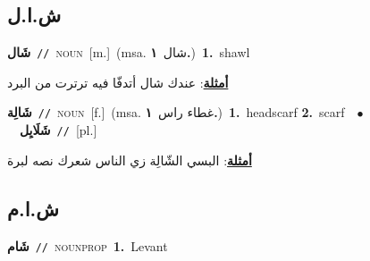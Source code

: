 \documentclass[10pt,a4paper,twoside]{article} %
\begin{document}
\begin{multicols}{2}
\vspace{-3mm}
\subsection*{\color{blue}\foreignlanguage{arabic}{ش.ا.ل}\color{blue}{ (ntws)}} 

{\setlength\topsep{0pt}\textbf{\foreignlanguage{arabic}{شَال}}\ {\color{gray}\texttt{//}\color{black}}\ \textsc{noun}\ [m.]\ \color{gray}(msa. \foreignlanguage{arabic}{شال}~\foreignlanguage{arabic}{\textbf{١.}})\color{black}\ \textbf{1.}~shawl\  \begin{flushright}\color{gray}\foreignlanguage{arabic}{\textbf{\underline{\foreignlanguage{arabic}{أمثلة}}}: عندك شال أتدفّا فيه ترترت من البرد}\end{flushright}\color{black}} \vspace{2mm}

{\setlength\topsep{0pt}\textbf{\foreignlanguage{arabic}{شَالِة}}\ {\color{gray}\texttt{//}\color{black}}\ \textsc{noun}\ [f.]\ \color{gray}(msa. \foreignlanguage{arabic}{غطاء راس}~\foreignlanguage{arabic}{\textbf{١.}})\color{black}\ \textbf{1.}~headscarf  \textbf{2.}~scarf\ \ $\bullet$\ \ \setlength\topsep{0pt}\textbf{\foreignlanguage{arabic}{شَلَايِل}}\ {\color{gray}\texttt{//}\color{black}}\ [pl.]\  \begin{flushright}\color{gray}\foreignlanguage{arabic}{\textbf{\underline{\foreignlanguage{arabic}{أمثلة}}}: البسي الشّالِة زي الناس شعرك نصه لبرة}\end{flushright}\color{black}} \vspace{2mm}

\vspace{-3mm}
\subsection*{\color{blue}\foreignlanguage{arabic}{ش.ا.م}\color{blue}{ (ntws)}} 

{\setlength\topsep{0pt}\textbf{\foreignlanguage{arabic}{شَام}}\ {\color{gray}\texttt{//}\color{black}}\ \textsc{noun\textunderscore prop}\ \textbf{1.}~Levant\ } \vspace{2mm}


\end{multicols}
\end{document}
